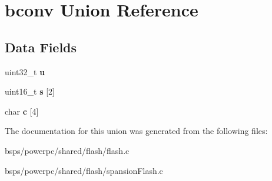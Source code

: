 \hypertarget{unionbconv}{}\section{bconv Union Reference}
\label{unionbconv}
\subsection*{Data Fields}
\begin{DoxyCompactItemize}
\item 
\mbox{\label{unionbconv_a654c7a33f55527c95805a359f360fa49}} 
uint32\+\_\+t {\bfseries u}
\item 
\mbox{\label{unionbconv_aace171219346b0ebac540533e083f01d}} 
uint16\+\_\+t {\bfseries s} \mbox{[}2\mbox{]}
\item 
\mbox{\label{unionbconv_abd30030b2ae892bc9250fc7294a0cb7c}} 
char {\bfseries c} \mbox{[}4\mbox{]}
\end{DoxyCompactItemize}


The documentation for this union was generated from the following files\+:\begin{DoxyCompactItemize}
\item 
bsps/powerpc/shared/flash/flash.\+c\item 
bsps/powerpc/shared/flash/spansion\+Flash.\+c\end{DoxyCompactItemize}
